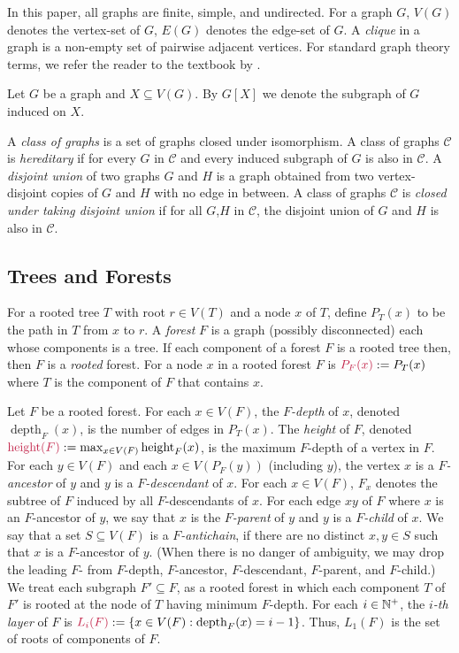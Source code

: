 \documentclass{patmorin}
\makeatletter
\newcommand{\defin}[1]{\emph{\textcolor{brightmaroon}{#1}}}
\def\mathcolor#1#{\@mathcolor{#1}}
\def\@mathcolor#1#2#3{%
  \protect\leavevmode
  \begingroup
    \color#1{#2}#3%
  \endgroup
}
\newcommand{\mathdefin}[1]{\mathcolor{brightmaroon}{#1}}
\DeclareMathOperator{\height}{height}
\DeclareMathOperator{\depth}{depth}
\newcommand{\calC}{\mathcal{C}}
\makeatother
\begin{document}
  In this paper, all graphs are finite, simple, and undirected.  For a graph $G$, \defin{$V(G)$} denotes the vertex-set of $G$, \defin{$E(G)$} denotes the edge-set of $G$.  A \defin{clique} in a graph is a non-empty set of pairwise adjacent vertices. For standard graph theory terms, we refer the reader to the textbook by \citet{diestel:graph}.

  Let $G$ be a graph and $X\subseteq V(G)$. By $G[X]$ we denote the subgraph of $G$ induced on $X$.

  A \defin{class of graphs} is a set of graphs closed under isomorphism. 
  A class of graphs $\calC$ is \defin{hereditary} if for every $G$ in $\calC$ and every induced subgraph of $G$ is also in $\calC$. 
  A \defin{disjoint union} of two graphs $G$ and $H$ is a graph obtained from two vertex-disjoint copies of $G$ and $H$ with no edge in between.
  A class of graphs $\calC$ is \defin{closed under taking disjoint union} if for all $G$,$H$ in $\calC$, the disjoint union of $G$ and $H$ is also in $\calC$. 
  


  \subsection{Trees and Forests}

  For a rooted tree $T$ with root $r\in V(T)$ and a node $x$ of $T$, define \defin{$P_T(x)$} to be the path in $T$ from $x$ to $r$.    A \defin{forest} $F$ is a graph (possibly disconnected) each whose components is a tree.  If each component of a forest $F$ is a rooted tree then, then $F$ is a \defin{rooted} forest. For a node $x$ in a rooted forest $F$ is $\mathdefin{P_F(x)}:=P_T(x)$ where $T$ is the component of $F$ that contains $x$.

  Let $F$ be a rooted forest.  For each $x\in V(F)$,
  the \defin{$F$-depth} of $x$, denoted \defin{$\depth_F(x)$}, is the number of edges in $P_T(x)$.
  The \defin{height} of $F$, denoted $\mathdefin{\height(F)}:=\max_{x\in V(F)}\height_F(x)$, is the maximum $F$-depth of a vertex in $F$.
  For each $y\in V(F)$ and each $x\in V(P_F(y))$ (including $y$),  the vertex $x$ is a \defin{$F$-ancestor} of $y$ and $y$ is a \defin{$F$-descendant} of $x$.  For each $x\in V(F)$, \defin{$F_x$} denotes the subtree of $F$ induced by all $F$-descendants of $x$.
  For each edge $xy$ of $F$ where $x$ is an $F$-ancestor of $y$, we say that $x$ is the \defin{$F$-parent} of $y$ and $y$ is a \defin{$F$-child} of $x$.
  We say that a set $S\subseteq V(F)$ is a \defin{$F$-antichain}, if there are no distinct $x,y\in S$ such that $x$ is a $F$-ancestor of $y$.  (When there is no danger of ambiguity, we may drop the leading $F$- from $F$-depth, $F$-ancestor, $F$-descendant, $F$-parent, and $F$-child.)
  We treat each subgraph $F'\subseteq F$, as a rooted forest in which each component $T$ of $F'$ is rooted at the node of $T$ having minimum $F$-depth.  For each $i\in\mathbb{N}^+$, the \defin{$i$-th layer} of $F$ is $\mathdefin{L_i(F)}:=\{x\in V(F):\depth_F(x)=i-1\}$.
  Thus, $L_1(F)$ is the set of roots of components of $F$.
\end{document}
